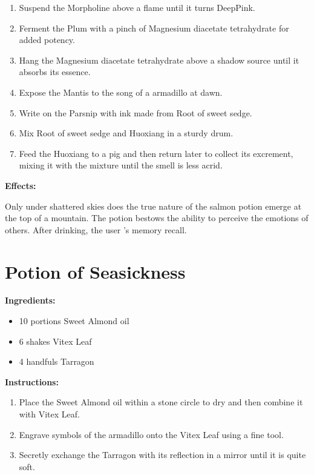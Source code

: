 \documentclass{article}
\begin{document}
\begin{enumerate}
  \item Suspend the Morpholine above a flame until it turns DeepPink.
  \item Ferment the Plum with a pinch of Magnesium diacetate tetrahydrate for added potency.
  \item Hang the Magnesium diacetate tetrahydrate above a shadow source until it absorbs its essence.
  \item Expose the Mantis to the song of a armadillo at dawn.
  \item Write on the Parsnip with ink made from Root of sweet sedge.
  \item Mix Root of sweet sedge and Huoxiang in a sturdy drum.
  \item Feed the Huoxiang to a pig and then return later to collect its excrement, mixing it with the mixture until the smell is less acrid.
\end{enumerate}

\textbf{Effects:}

Only under shattered skies does the true nature of the salmon potion emerge at the top of a mountain. The potion bestows the ability to perceive the emotions of others. After drinking, the user 's memory recall.

\newpage
\section*{Potion of Seasickness}

\textbf{Ingredients:}

\begin{itemize}
  \item 10 portions Sweet Almond oil
  \item 6 shakes Vitex Leaf
  \item 4 handfuls Tarragon
\end{itemize}

\textbf{Instructions:}

\begin{enumerate}
  \item Place the Sweet Almond oil within a stone circle to dry and then combine it with Vitex Leaf.
  \item Engrave symbols of the armadillo onto the Vitex Leaf using a fine tool.
  \item Secretly exchange the Tarragon with its reflection in a mirror until it is quite soft.
\end{enumerate}
\end{document}
